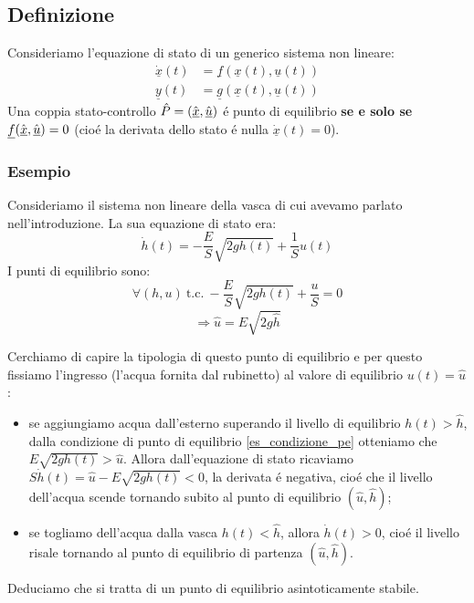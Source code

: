 \documentclass[../main.tex]{subfiles}
\begin{document}
	\subsection{Definizione}
		Consideriamo l'equazione di stato di un generico sistema non lineare:
		\begin{align*}
			\underline{\dot x}(t) &= \underline f(\underline x(t), \underline u(t))\\
			\underline y(t) &= \underline g(\underline x(t), \underline u(t))
		\end{align*}
		Una coppia stato-controllo $ \hat P = (\hat{\underline x}, \hat{\underline u}) $ \'e punto di equilibrio \textbf{se e solo se} $ \underline f (\hat{\underline x}, \hat{\underline u}) = 0 $ (cio\'e la derivata dello stato \'e nulla $ \underline{\dot x}(t) = 0 $).
		
	\subsubsection*{Esempio}
		Consideriamo il sistema non lineare della vasca di cui avevamo parlato nell'introduzione. La sua equazione di stato era:
		\[ \dot h(t) = -\frac{E}{S} \sqrt{2g h(t)} + \frac{1}{S} u(t) \]
		I punti di equilibrio sono:
		\[ \forall (h, u)\ \text{t.c.}\ -\frac{E}{S} \sqrt{2g h(t)} + \frac{u}{S} = 0 \]
		\begin{equation}
			\label{es_condizione_pe}
			\Rightarrow \hat u = E \sqrt{2g \hat h}
		\end{equation}
		
		Cerchiamo di capire la tipologia di questo punto di equilibrio e per questo fissiamo l'ingresso (l'acqua fornita dal rubinetto) al valore di equilibrio $ u(t) = \hat u $:
		\begin{itemize}
			\item se aggiungiamo acqua dall'esterno superando il livello di equilibrio $ h(t) > \hat h $, dalla condizione di punto di equilibrio \ref{es_condizione_pe} otteniamo che $ E \sqrt{2gh(t)} > \hat u $. Allora dall'equazione di stato ricaviamo $ S \dot h(t) = \hat u - E \sqrt{2gh(t)} < 0 $, la derivata \'e negativa, cio\'e che il livello dell'acqua scende tornando subito al punto di equilibrio $ (\hat u, \hat h) $;
			\item se togliamo dell'acqua dalla vasca $ h(t) < \hat h $, allora $ \dot h(t) > 0 $, cio\'e il livello risale tornando al punto di equilibrio di partenza $ (\hat u, \hat h) $.
		\end{itemize}
		Deduciamo che si tratta di un punto di equilibrio asintoticamente stabile.
		
\end{document}
